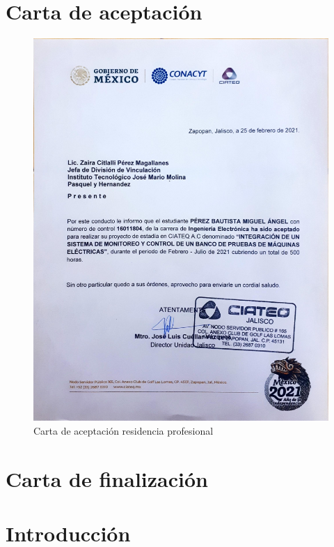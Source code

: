 \documentclass[12pt,titlepage]{article}
\begin{document}
\section{Carta de aceptación}
\begin{figure}[!h]
\hspace*{1.0cm} 
\includegraphics[scale=0.82]{carta_acep}
\caption{Carta de aceptación residencia profesional}
\end{figure}

\newpage
\section{Carta de finalización}

\newpage

\section{Introducción} %
\end{document}
